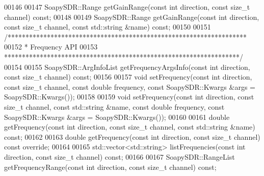 \begin{DoxyCode}
00146 
00147     SoapySDR::Range getGainRange(\textcolor{keyword}{const} \textcolor{keywordtype}{int} direction, \textcolor{keyword}{const} \textcolor{keywordtype}{size\_t} channel) \textcolor{keyword}{const};
00148 
00149     SoapySDR::Range getGainRange(\textcolor{keyword}{const} \textcolor{keywordtype}{int} direction, \textcolor{keyword}{const} \textcolor{keywordtype}{size\_t} channel, \textcolor{keyword}{const} 
      std::string &name) \textcolor{keyword}{const};
00150 
00151     \textcolor{comment}{/*******************************************************************}
00152 \textcolor{comment}{     * Frequency API}
00153 \textcolor{comment}{     ******************************************************************/}
00154 
00155     SoapySDR::ArgInfoList getFrequencyArgsInfo(\textcolor{keyword}{const} \textcolor{keywordtype}{int} direction, \textcolor{keyword}{const} \textcolor{keywordtype}{size\_t} channel) \textcolor{keyword}{const};
00156 
00157     \textcolor{keywordtype}{void} setFrequency(\textcolor{keyword}{const} \textcolor{keywordtype}{int} direction, \textcolor{keyword}{const} \textcolor{keywordtype}{size\_t} channel, \textcolor{keyword}{const} \textcolor{keywordtype}{double} 
      frequency, \textcolor{keyword}{const} SoapySDR::Kwargs &args = SoapySDR::Kwargs());
00158 
00159     \textcolor{keywordtype}{void} setFrequency(\textcolor{keyword}{const} \textcolor{keywordtype}{int} direction, \textcolor{keyword}{const} \textcolor{keywordtype}{size\_t} channel, \textcolor{keyword}{const} 
      std::string &name, \textcolor{keyword}{const} \textcolor{keywordtype}{double} frequency, \textcolor{keyword}{const} SoapySDR::Kwargs &args = 
      SoapySDR::Kwargs());
00160 
00161     \textcolor{keywordtype}{double} getFrequency(\textcolor{keyword}{const} \textcolor{keywordtype}{int} direction, \textcolor{keyword}{const} \textcolor{keywordtype}{size\_t} channel, \textcolor{keyword}{const} 
      std::string &name) \textcolor{keyword}{const};
00162 
00163     \textcolor{keywordtype}{double} getFrequency(\textcolor{keyword}{const} \textcolor{keywordtype}{int} direction, \textcolor{keyword}{const} \textcolor{keywordtype}{size\_t} channel) \textcolor{keyword}{const override};
00164 
00165     std::vector<std::string> listFrequencies(\textcolor{keyword}{const} \textcolor{keywordtype}{int} direction, \textcolor{keyword}{const} \textcolor{keywordtype}{size\_t} channel) \textcolor{keyword}{const};
00166 
00167     SoapySDR::RangeList getFrequencyRange(\textcolor{keyword}{const} \textcolor{keywordtype}{int} direction, \textcolor{keyword}{const} \textcolor{keywordtype}{size\_t} channel) \textcolor{keyword}{const};

\end{DoxyCode}
